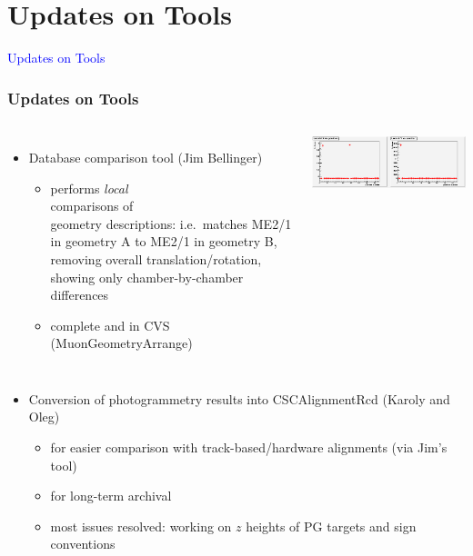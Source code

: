 \documentclass[compress]{beamer}
\begin{document}
\section*{Updates on Tools}
\begin{frame}
\begin{center}
\Huge \textcolor{blue}{Updates on Tools}
\end{center}
\end{frame}

\begin{frame}
\frametitle{Updates on Tools}

\vspace{-1.4 cm}
\begin{columns}

\vspace{1.7 cm}
\begin{itemize}
\item Database comparison tool (Jim Bellinger)

\begin{minipage}{10 cm}
\begin{itemize}
\item performs {\it local} \\ comparisons of \\ geometry descriptions: i.e.\ matches ME2/1 in geometry A to ME2/1 in geometry B, removing overall translation/rotation, showing only chamber-by-chamber differences
\item complete and in CVS (MuonGeometryArrange)
\end{itemize}
\end{minipage}
\end{itemize}

\includegraphics[width=\linewidth]{jimb_tool.png}
\end{columns}

\begin{itemize}
\item Conversion of photogrammetry results into CSCAlignmentRcd (Karoly and Oleg)
\begin{itemize}
\item for easier comparison with track-based/hardware alignments (via Jim's tool)
\item for long-term archival
\item most issues resolved: working on $z$ heights of PG targets and sign conventions
\end{itemize}

\end{itemize}
\end{frame}
\end{document}

